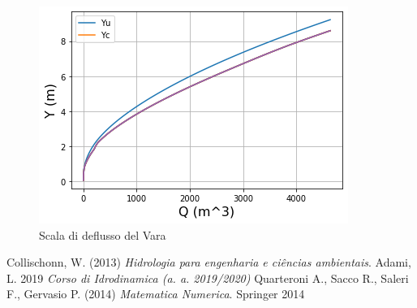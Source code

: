 \documentclass[12pt]{article} %
\begin{document}
\begin{figure} [H]
    \centering
    \includegraphics[scale=0.8]{deflussova.png}
    \caption{Scala di deflusso del Vara}
    \label{fig:Vara_scala_deflusso}
\end{figure}

\newpage

\begin{thebibliography}{}
Collischonn, W. (2013) \textit{Hidrologia para engenharia e ciências ambientais}.
Adami, L. 2019 \textit{Corso di Idrodinamica (a. a. 2019/2020)}
Quarteroni A., Sacco R., Saleri F., Gervasio P. (2014) \textit{Matematica Numerica}. Springer 2014
\end{thebibliography}
\end{document}
